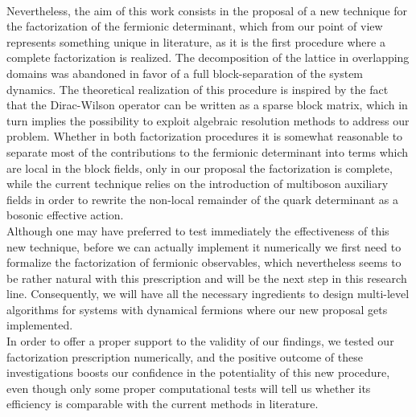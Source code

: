 \\ Nevertheless, the aim of this work consists in the proposal of a new technique for the factorization of the fermionic determinant, which from our point of view represents something unique in literature, as it is the first procedure where a complete factorization is realized. The decomposition of the lattice in overlapping domains was abandoned in favor of a full block-separation of the system dynamics. The theoretical realization of this procedure is inspired by the fact that the Dirac-Wilson operator can be written as a sparse block matrix, which in turn implies the possibility to exploit algebraic resolution methods to address our problem. Whether in both factorization procedures it is somewhat reasonable to separate most of the contributions to the fermionic determinant into terms which are local in the block fields, only in our proposal the factorization is complete, while the current technique relies on the introduction of multiboson auxiliary fields in order to rewrite the non-local remainder of the quark determinant as a bosonic effective action.
\\ Although one may have preferred to test immediately the effectiveness of this new technique, before we can actually implement it numerically we first need to formalize the factorization of fermionic observables, which nevertheless seems to be rather natural with this prescription and will be the next step in this research line. Consequently, we will have all the necessary ingredients to design multi-level algorithms for systems with dynamical fermions where our new proposal gets implemented.
\\ In order to offer a proper support to the validity of our findings, we tested our factorization prescription numerically, and the positive outcome of these investigations boosts our confidence in the potentiality of this new procedure, even though only some proper computational tests will tell us whether its efficiency is comparable with the current methods in literature.